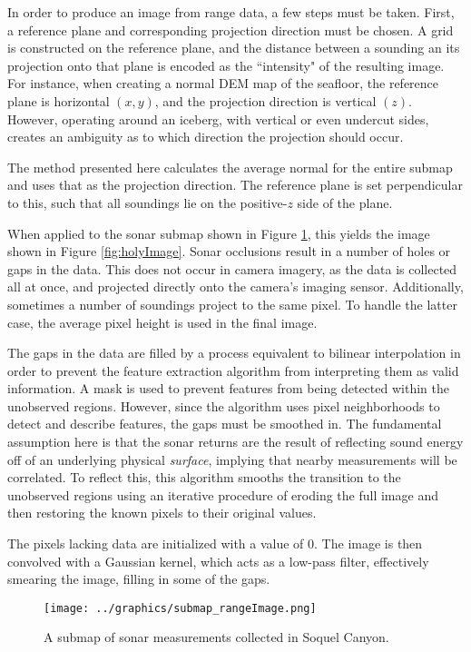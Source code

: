 In order to produce an image from range data, a few steps must be taken. First, a reference plane and corresponding projection direction must be chosen. A grid is constructed on the reference plane, and the distance between a sounding an its projection onto that plane is encoded as the ``intensity" of the resulting image. For instance, when creating a normal DEM map of the seafloor, the reference plane is horizontal $(x,y)$, and the projection direction is vertical $(z)$. However, operating around an iceberg, with vertical or even undercut sides, creates an ambiguity as to which direction the projection should occur. 

The method presented here calculates the average normal for the entire submap and uses that as the projection direction. The reference plane is set perpendicular to this, such that all soundings lie on the positive-$z$ side of the plane.

When applied to the sonar submap shown in Figure \ref{fig:submap_rangeImage}, this yields the image shown in Figure \ref{fig:holyImage}. Sonar occlusions result in a number of holes or gaps in the data. This does not occur in camera imagery, as the data is collected  all at once, and projected directly onto the camera's imaging sensor. Additionally, sometimes a number of soundings project to the same pixel. To handle the latter case, the average pixel height is used in the final image. 

The gaps in the data are filled by a process equivalent to bilinear interpolation in order to prevent the feature extraction algorithm from interpreting them as valid information. A mask is used to prevent features from being detected within the unobserved regions. However, since the algorithm uses pixel neighborhoods to detect and describe features, the gaps must be smoothed in. The fundamental assumption here is that the sonar returns are the result of reflecting sound energy off of an underlying physical \emph{surface}, implying that nearby measurements will be correlated.  To reflect this, this algorithm smooths the transition to the unobserved regions using an iterative procedure of eroding the full image and then restoring the known pixels to their original values.

The pixels lacking data are initialized with a value of $0$. The image is then convolved with a Gaussian kernel, which acts as a low-pass filter, effectively smearing the image, filling in some of the gaps. 

\begin{figure}[htb]
   \centering
   \texttt{[image: ../graphics/submap\_rangeImage.png]} %
   \caption{A submap of sonar measurements collected in Soquel Canyon.}
   \label{fig:submap_rangeImage}
\end{figure}

